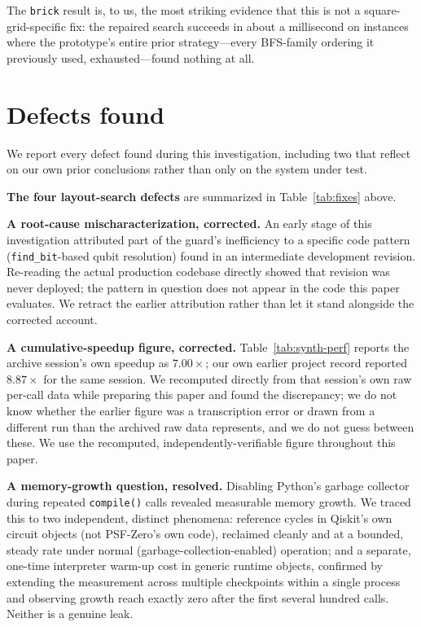 \documentclass[11pt]{article}
\begin{document}
The \texttt{brick} result is, to us, the most striking evidence that
this is not a square-grid-specific fix: the repaired search succeeds in
about a millisecond on instances where the prototype's entire prior
strategy---every BFS-family ordering it previously used, exhausted---found
nothing at all.

\section{Defects found}
\label{sec:defects}

We report every defect found during this investigation, including two
that reflect on our own prior conclusions rather than only on the
system under test.

\textbf{The four layout-search defects} are summarized in
Table~\ref{tab:fixes} above.

\textbf{A root-cause mischaracterization, corrected.} An early stage of
this investigation attributed part of the guard's inefficiency to a
specific code pattern (\texttt{find\_bit}-based qubit resolution) found
in an intermediate development revision. Re-reading the actual
production codebase directly showed that revision was never deployed;
the pattern in question does not appear in the code this paper
evaluates. We retract the earlier attribution rather than let it stand
alongside the corrected account.

\textbf{A cumulative-speedup figure, corrected.} Table~\ref{tab:synth-perf}
reports the archive session's own speedup as $7.00\times$; our own
earlier project record reported $8.87\times$ for the same session. We
recomputed directly from that session's own raw per-call data while
preparing this paper and found the discrepancy; we do not know whether
the earlier figure was a transcription error or drawn from a different
run than the archived raw data represents, and we do not guess between
these. We use the recomputed, independently-verifiable figure
throughout this paper.

\textbf{A memory-growth question, resolved.} Disabling Python's garbage
collector during repeated \texttt{compile()} calls revealed measurable
memory growth. We traced this to two independent, distinct phenomena:
reference cycles in Qiskit's own circuit objects (not PSF-Zero's own
code), reclaimed cleanly and at a bounded, steady rate under normal
(garbage-collection-enabled) operation; and a separate, one-time
interpreter warm-up cost in generic runtime objects, confirmed by
extending the measurement across multiple checkpoints within a single
process and observing growth reach exactly zero after the first
several hundred calls. Neither is a genuine leak.
\end{document}
